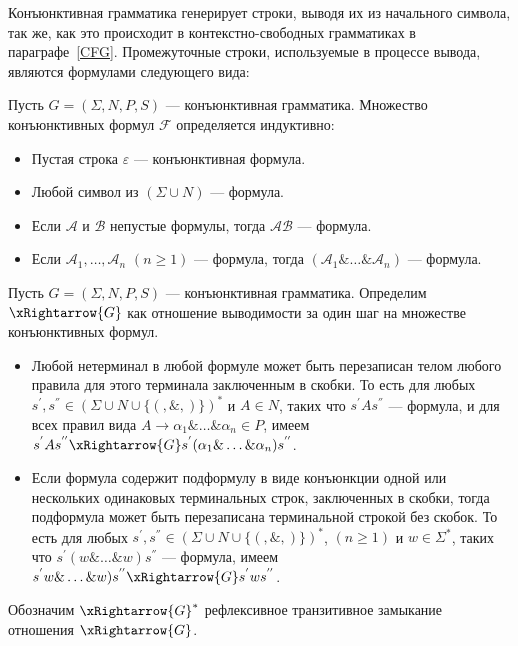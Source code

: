 Конъюнктивная грамматика генерирует строки, выводя их из начального символа, так же, как это происходит в контекстно-свободных грамматиках в параграфе~\ref{CFG}. Промежуточные строки, используемые в процессе вывода, являются формулами следующего вида:

\begin{definition}\label{Definition of conjunctive formula}
	Пусть $G = (\Sigma,N,P,S)$ --- конъюнктивная грамматика. Множество конъюнктивных формул $ \mathcal{F}$ определяется индуктивно:
	\begin{itemize}
		\item Пустая строка $\varepsilon$ --- конъюнктивная формула. 
		\item Любой символ из $(\Sigma \cup N)$ --- формула.
		\item Если $\mathcal{A}$ и $\mathcal{B}$ непустые формулы, тогда $\mathcal{AB}$ --- формула.
		\item Если $\mathcal{A}_1,\ldots,\mathcal{A}_n$ $(n \geqslant 1)$ --- формула, тогда $(\mathcal{A}_1\&\ldots\&\mathcal{A}_n)$ --- формула.
	\end{itemize}
\end{definition}

\begin{definition}
	Пусть $G = (\Sigma,N,P,S)$ --- конъюнктивная грамматика. Определим $\xRightarrow{G}$ как отношение выводимости за один шаг на множестве конъюнктивных формул.
	\begin{itemize}
	    \item Любой нетерминал в любой формуле может быть перезаписан телом любого правила для этого терминала заключенным в скобки. То есть для любых $s^{'},s^{''} \in (\Sigma \cup N \cup \{(, \&, )\})^*$ и $A\in N$, таких что $s^{'}As^{''}$ --- формула, и для всех правил вида $A \rightarrow \alpha_1\&\ldots\&\alpha_n \in P$, имеем $s^{'}As^{''}\xRightarrow{G}s^{'}(\alpha_1\&\ldots\&\alpha_n)s^{''}$. 
	    \item Если формула содержит подформулу в виде конъюнкции одной или нескольких одинаковых терминальных строк, заключенных в скобки, тогда подформула может быть перезаписана терминальной строкой без скобок. То есть для любых $s^{'},s^{''} \in (\Sigma \cup N \cup \{(, \&, )\})^*$, $(n \geqslant 1)$ и $w \in \Sigma^*$, таких что $s^{'}(w\&\ldots\&w)s^{''}$ --- формула, имеем $s^{'}w\&\ldots\&w)s^{''}\xRightarrow{G}s^{'}ws^{''}$.
	\end{itemize}
	Обозначим $\xRightarrow{G}^*$ рефлексивное транзитивное замыкание отношения $\xRightarrow{G}$.
\end{definition}

